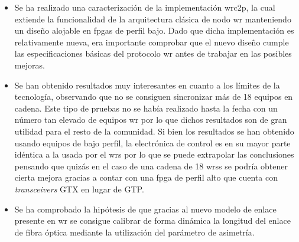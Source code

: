 \begin{itemize}
	\item Se ha realizado una caracterización de la implementación \gls{wrc2p}, 
	la cual extiende la funcionalidad de la arquitectura clásica de nodo 
	\gls{wr} manteniendo un diseño alojable en \gls{fpga}s de perfil bajo. Dado 
	que dicha implementación es relativamente nueva, era importante comprobar 
	que el nuevo diseño cumple las especificaciones básicas del protocolo  
	\gls{wr} antes de trabajar en las posibles mejoras.
	
	\item Se han obtenido resultados muy interesantes en cuanto a los límites 
	de la tecnología, observando que no se consiguen sincronizar más de 18 
	equipos en cadena. Este tipo de pruebas no se había realizado hasta la 
	fecha con un número tan elevado de equipos \gls{wr} por lo que dichos 
	resultados son de gran utilidad para el resto de la comunidad. Si bien los 
	resultados se han obtenido usando equipos de bajo perfil, la electrónica de 
	control es en su mayor parte idéntica a la usada por el \gls{wrs} por lo 
	que se puede extrapolar las conclusiones pensando que quizás en el caso de 
	una cadena de 18 \gls{wrs}s se podría obtener cierta mejora gracias a 
	contar con una \gls{fpga} de perfil alto que cuenta con 
	\textit{transceivers} GTX en lugar 
	de GTP.
	
	\item Se ha comprobado la hipótesis de que gracias al nuevo modelo de 
	enlace presente en \gls{wr} se consigue calibrar de forma dinámica la 
	longitud del enlace de fibra óptica mediante la utilización del parámetro 
	de asimetría.
\end{itemize}

